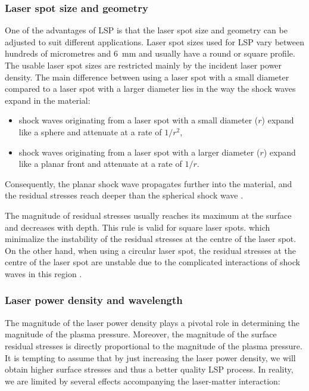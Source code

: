 \subsubsection*{Laser spot size and geometry}

One of the advantages of LSP is that the laser spot size and geometry can be adjusted to suit different applications. Laser spot sizes used for LSP vary between hundreds of micrometres and \SI{6}{\milli\meter} and usually have a round or square profile. The usable laser spot sizes are restricted mainly by the incident laser power density. The main difference between using a laser spot with a small diameter compared to a laser spot with a larger diameter lies in the way the shock waves expand in the material:

\begin{itemize}

    \item shock waves originating from a laser spot with a small diameter (\(r\)) expand like a sphere and attenuate at a rate of \(1/r^2\),

    \item shock waves originating from a laser spot with a larger diameter (\(r\))  expand like a planar front and attenuate at a rate of \(1/r\).

\end{itemize}
Consequently, the planar shock wave propagates further into the material, and the residual stresses reach deeper than the spherical shock wave \cite{bolger_montross_rode_1999}. 

The magnitude of residual stresses usually reaches its maximum at the surface and decreases with depth. This rule is valid for square laser spots. which minimalize the instability of the residual stresses at the centre of the laser spot. On the other hand, when using a circular laser spot, the residual stresses at the centre of the laser spot are unstable due to the complicated interactions of shock waves in this region \cite{masse_barreau_1995}. 

\subsubsection*{Laser power density and wavelength}

The magnitude of the laser power density plays a pivotal role in determining the magnitude of the plasma pressure. Moreover, the magnitude of the surface residual stresses is directly proportional to the magnitude of the plasma pressure. It is tempting to assume that by just increasing the laser power density, we will obtain higher surface stresses and thus a better quality LSP process. In reality, we are limited by several effects accompanying the laser-matter interaction:

